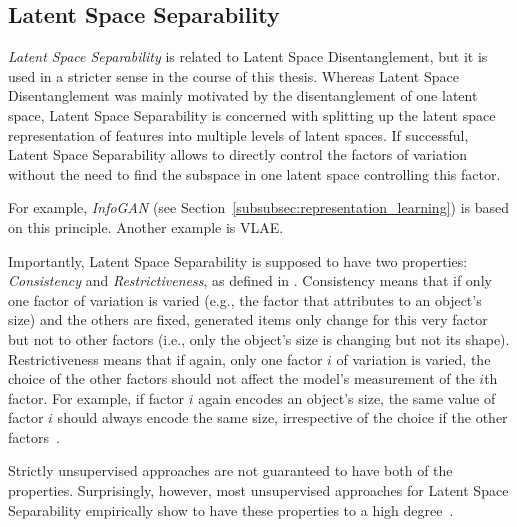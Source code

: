 \subsection{Latent Space Separability}\label{subsec:feature-separability}

\textit{Latent Space Separability} is related to Latent Space Disentanglement, but it is used in a stricter sense in the course of this thesis.
Whereas Latent Space Disentanglement was mainly motivated by the disentanglement of one latent space, Latent Space Separability is concerned with splitting up the latent space representation of features into multiple levels of latent spaces.
If successful, Latent Space Separability allows to directly control the factors of variation without the need to find the subspace in one latent space controlling this factor.

For example, \textit{InfoGAN} (see Section~\ref{subsubsec:representation_learning}) is based on this principle.
Another example is \ac{VLAE}.

Importantly, Latent Space Separability is supposed to have two properties: \textit{Consistency} and \textit{Restrictiveness}, as defined in \citet{Shu2020Weakly}.
Consistency means that if only one factor of variation is varied (e.g., the factor that attributes to an object's size) and the others are fixed, generated items only change for this very factor but not to other factors (i.e., only the object's size is changing but not its shape).
Restrictiveness means that if again, only one factor $i$ of variation is varied, the choice of the other factors should not affect the model's measurement of the $i$th factor.
For example, if factor $i$ again encodes an object's size, the same value of factor $i$ should always encode the same size, irrespective of the choice if the other factors~\citep{Shu2020Weakly}.

Strictly unsupervised approaches are not guaranteed to have both of the properties.
Surprisingly, however, most unsupervised approaches for Latent Space Separability empirically show to have these properties to a high degree~\citep{Shu2020Weakly}.


